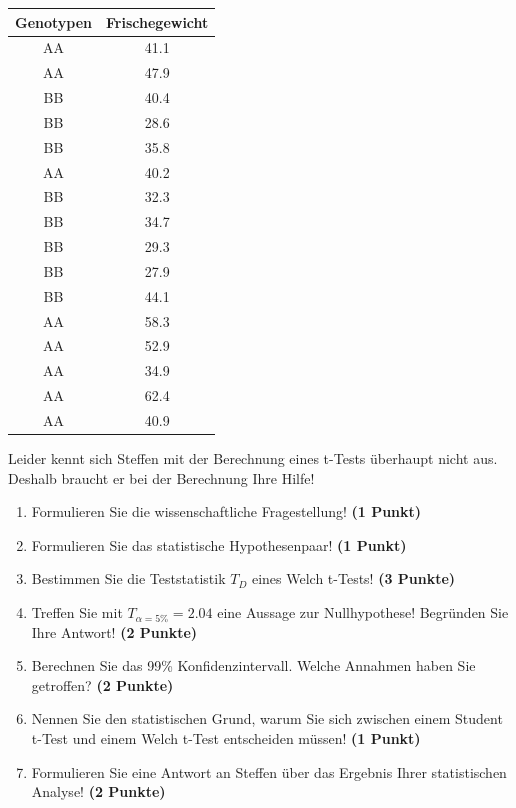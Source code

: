 \documentclass[a4paper, 9pt]{scrartcl}\usepackage[]{graphicx}\usepackage[]{xcolor}
\begin{document}
\begin{table}[!h]
\centering
\begin{tabular}{cc}
\toprule
Genotypen & Frischegewicht\\
\midrule
AA & 41.1\\
AA & 47.9\\
BB & 40.4\\
BB & 28.6\\
BB & 35.8\\
\addlinespace
AA & 40.2\\
BB & 32.3\\
BB & 34.7\\
BB & 29.3\\
BB & 27.9\\
\addlinespace
BB & 44.1\\
AA & 58.3\\
AA & 52.9\\
AA & 34.9\\
AA & 62.4\\
\addlinespace
AA & 40.9\\
\bottomrule
\end{tabular}
\end{table}



Leider kennt sich Steffen mit der Berechnung eines t-Tests überhaupt nicht aus. Deshalb braucht er bei der Berechnung Ihre Hilfe!

\begin{enumerate}
  \item Formulieren Sie die wissenschaftliche Fragestellung! \textbf{(1 Punkt)}
  \item Formulieren Sie das statistische Hypothesenpaar! \textbf{(1 Punkt)}
  \item Bestimmen Sie die Teststatistik $T_{D}$ eines  Welch t-Tests! \textbf{(3 Punkte)}
  \item Treffen Sie mit $T_{\alpha = 5\%} = 2.04$ eine Aussage zur Nullhypothese! Begründen Sie Ihre Antwort! \textbf{(2 Punkte)}
\item Berechnen Sie das 99\% Konfidenzintervall. Welche Annahmen haben Sie getroffen? \textbf{(2 Punkte)}
\item Nennen Sie den statistischen Grund, warum Sie sich zwischen einem Student t-Test und einem Welch t-Test entscheiden müssen! \textbf{(1 Punkt)}
\item Formulieren Sie eine Antwort an Steffen über das Ergebnis Ihrer statistischen Analyse! \textbf{(2 Punkte)}
\end{enumerate} 
\clearpage
\end{document}
